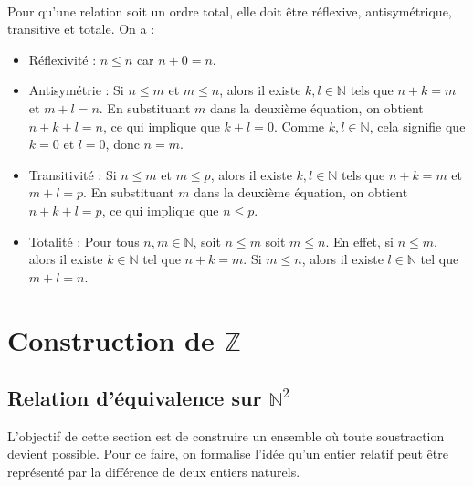 \documentclass{article}
\begin{document}


\\
Pour qu'une relation soit un ordre total, elle doit être réflexive, antisymétrique, transitive et totale. On a :
\begin{itemize}
    \item Réflexivité : $n \leq n$ car $n + 0 = n$.
    \item Antisymétrie : Si $n \leq m$ et $m \leq n$, alors il existe $k, l \in \mathbb{N}$ tels que $n + k = m$ et $m + l = n$. En substituant $m$ dans la deuxième équation, on obtient $n + k + l = n$, ce qui implique que $k + l = 0$. Comme $k, l \in \mathbb{N}$, cela signifie que $k = 0$ et $l = 0$, donc $n = m$.
    \item Transitivité : Si $n \leq m$ et $m \leq p$, alors il existe $k, l \in \mathbb{N}$ tels que $n + k = m$ et $m + l = p$. En substituant $m$ dans la deuxième équation, on obtient $n + k + l = p$, ce qui implique que $n \leq p$.
    \item Totalité : Pour tous $n, m \in \mathbb{N}$, soit $n \leq m$ soit $m \leq n$. En effet, si $n \leq m$, alors il existe $k \in \mathbb{N}$ tel que $n + k = m$. Si $m \leq n$, alors il existe $l \in \mathbb{N}$ tel que $m + l = n$.
\end{itemize}
\section{Construction de $\mathbb{Z}$}

\subsection{Relation d'équivalence sur $\mathbb{N}^2$}

L'objectif de cette section est de construire un ensemble où toute soustraction devient possible. Pour ce faire, on formalise l'idée qu'un entier relatif peut être représenté par la différence de deux entiers naturels.

\end{document}
